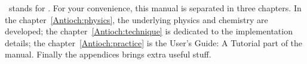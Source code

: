 \Antioch\ stands for \ANTIOCH. For your convenience,
this manual is separated in three chapters. In the
chapter~\ref{Antioch:physics}, the underlying physics
and chemistry are developed; the chapter~\ref{Antioch:technique}
is dedicated to the implementation details; the chapter~\ref{Antioch:practice}
is the \textsf{User's Guide: A Tutorial} part of the manual. Finally
the appendices brings extra useful stuff.
